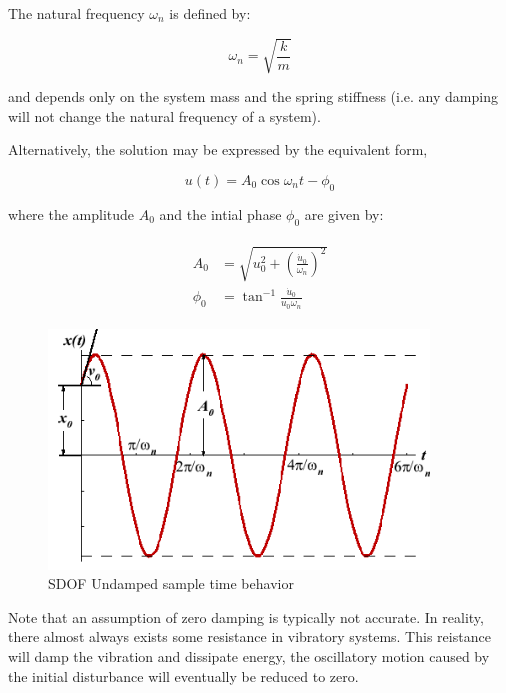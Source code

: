\documentclass[10pt,b5paper,titlepage]{book}
\newenvironment{ematrix}
{
    \begin{eqnarray}
        \begin{aligned}
}
{
        \end{aligned}
    \end{eqnarray}
}
\begin{document}
The natural frequency $ \omega_n $ is defined by:

\begin{equation}
    \omega_n = \sqrt{\frac{k}{m}}
\end{equation}

and depends only on the system mass and the spring stiffness (i.e. any damping will
not change the natural frequency of a system).

Alternatively, the solution may be expressed by the equivalent form,

\begin{equation}
    u(t) = A_0 \cos{\omega_n t - \phi_0}
\end{equation}

where the amplitude $ A_0 $ and the intial phase $ \phi_0 $ are given by:

\begin{ematrix}
    A_0 &= \sqrt{u_0^2 + \left(\frac{\dot{u}_0}{\omega_n}\right)^2}\\
    \phi_0 &= \tan^{-1}\frac{\dot{u}_0}{u_0 \omega_n}
\end{ematrix}

\begin{figure}[ht]
    \centering
    \includegraphics[width=0.90\textwidth]{img/SDOF_Undamped_Response.png}
    \caption{SDOF Undamped sample time behavior}
    \label{fig:SDOF-undamped-response-png}
\end{figure}

Note that an assumption of zero damping is typically not accurate. In reality,
there almost always exists some resistance in vibratory systems. This reistance
will damp the vibration and dissipate energy, the oscillatory motion caused by the
initial disturbance will eventually be reduced to zero.
\end{document}
